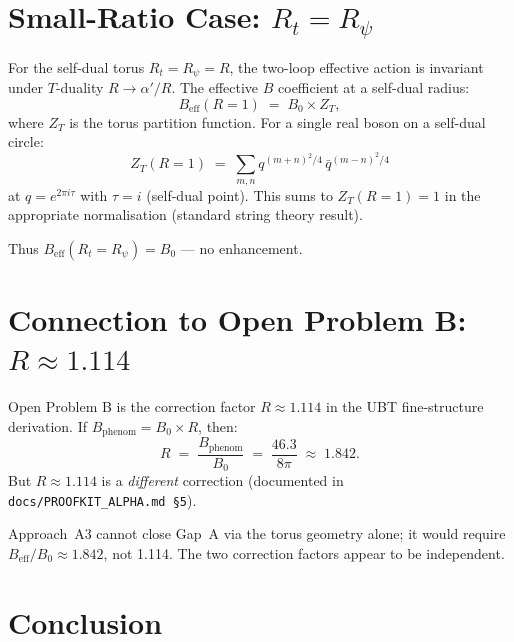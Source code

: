 \documentclass[12pt,a4paper]{article}
\theoremstyle{definition}
\theoremstyle{remark}
\begin{document}
\section{Small-Ratio Case: $R_t = R_\psi$}
\label{sec:small_ratio}

For the self-dual torus $R_t = R_\psi = R$, the two-loop effective action
is invariant under $T$-duality $R \to \alpha'/R$.  The effective $B$
coefficient at a self-dual radius:
\begin{equation}
  B_{\mathrm{eff}}(R = 1) \;=\; B_0 \times Z_T,
\end{equation}
where $Z_T$ is the torus partition function.  For a single real boson on a
self-dual circle:
\begin{equation}
  Z_T(R=1) \;=\; \sum_{m,n} q^{(m+n)^2/4}\,\bar{q}^{(m-n)^2/4}
\end{equation}
at $q = e^{2\pi i \tau}$ with $\tau = i$ (self-dual point).  This sums to
$Z_T(R=1) = 1$ in the appropriate normalisation (standard string theory
result).

Thus $B_{\mathrm{eff}}(R_t = R_\psi) = B_0$ --- no enhancement.

\section{Connection to Open Problem B: $R \approx 1.114$}
\label{sec:openproblemB}

Open Problem B is the correction factor $R \approx 1.114$ in the UBT
fine-structure derivation.  If $B_{\mathrm{phenom}} = B_0 \times R$, then:
\begin{equation}
  R \;=\; \frac{B_{\mathrm{phenom}}}{B_0}
    \;=\; \frac{46.3}{8\pi}
    \;\approx\; 1.842.
\end{equation}
But $R \approx 1.114$ is a \emph{different} correction (documented in
\texttt{docs/PROOFKIT\_ALPHA.md~§5}).

Approach~A3 cannot close Gap~A via the torus geometry alone; it would
require $B_{\mathrm{eff}}/B_0 \approx 1.842$, not 1.114.  The two
correction factors appear to be independent.

\section{Conclusion}
\label{sec:conclusion}
\end{document}
